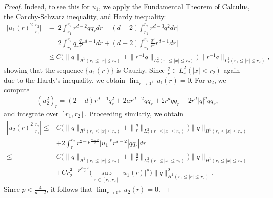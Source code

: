 \documentclass[12pt]{amsart}
\begin{document}

\begin{proof} 
Indeed, to see this for $u_1$, we apply the Fundamental Theorem of Calculus, the Cauchy-Schwarz inequality, and Hardy inequality:
\begin{align*}
\big|u_1(r)^2|_{r_1}^{r_2} \big|&= \Big| 2\int_{r_1}^{r_2} r^{d-2} qq_r dr+(d-2)\int_{r_1}^{r_2}r^{d-3} q^2 dr \Big|\\
&=  \Big| 2\int_{r_1}^{r_2}q_r\tfrac q r r^{d-1} dr+(d-2)\int_{r_1}^{r_2} \tfrac{q^2}{r^2} r^{d-1} dr  \Big|\\
& \le C(\|q\|_{H^1(r_1 \le |x| \le r_2)} + \|r^{-1} q \|_{L_x^2(r_1\le |x|\le r_2)} \big)  \|r^{-1} q \|_{L_x^2(r_1\le |x|\le r_2)},
\end{align*}
showing that the sequence $\{u_1(r)\}$ is Cauchy. Since $\frac qr \in L_x^2 (|x| < r_2)$ again due to  the Hardy's inequality, we obtain $\lim_{r\to 0^+} u_1(r) =0$. 
For $u_2$, we compute
\begin{align*}
(u_2^2)_r=(2-d) r^{d-1}q_r^2+2a r^{d-2}qq_r+2r^d qq_r-2r^d |q|^{p}qq_r,
\end{align*}
and integrate over $[r_1,r_2]$. Proceeding similarly, we obtain
\begin{align*}
\left|u_2(r)^2|_{r_1}^{r_2} \right|\le & C(\|q\|_{H^1(r_1\le |x|\le r_2)} + \|\tfrac qr \|_{L_x^2(r_1\le |x|\le r_2)} \big)\|q\|_{H^1(r_1 \le |x| \le r_2)} \\
& +2\int_{r_1}^{r_2} r^{2-p\frac{d-2}2}|u_1|^p r^{d-2}|qq_r |dr\\
\le & C(\|q\|_{H^1(r_1\le |x|\le r_2)} + \|\tfrac qr \|_{L_x^2(r_1\le |x|\le r_2)} \big) \|q\|_{H^1(r_1 \le |x| \le r_2)} \\
& +C r_2^{2-p\tfrac{d-2}2} \big(\sup_{r\in[r_1, r_2]}|u_1(r)|^p \big) \|q\|_{H^1(r_1 \le |x| \le r_2)}^2.
\end{align*}
Since $p<\frac 4{d-2}$, it follows that $\lim_{r\to 0^+} u_2(r) = 0$.
\end{proof}
\end{document}

